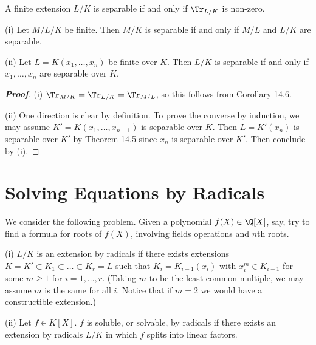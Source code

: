 \begin{corollary}
A finite extension $L/K$ is separable if and only if $\Tr_{L/K}$ is non-zero.
\end{corollary}

\begin{corollary}
\ben
\item [(i)] Let $M/L/K$ be finite. Then $M/K$ is separable if and only if $M/L$ and $L/K$ are separable.
\item [(ii)] Let $L = K(x_1, \dots , x_n)$ be finite over $K$. Then $L/K$ is separable if and only if $x_1, \dots , x_n$ are separable over $K$.
\een
\end{corollary}

\begin{proof}[\bf Proof]
\ben
\item [(i)] $\Tr_{M/K} = \Tr_{L/K} = \Tr_{M/L}$, so this follows from Corollary 14.6.
\item [(ii)] One direction is clear by definition. To prove the converse by induction, we may assume $K' = K(x_1, \dots , x_{n-1})$ is separable over $K$. Then $L = K'(x_n)$ is separable over $K'$ by Theorem 14.5 since $x_n$ is separable over $K'$. Then conclude by (i).
\een
\end{proof}


\section{Solving Equations by Radicals}

We consider the following problem. Given a polynomial $f(X) \in \Q[X]$, say, try to find a formula for roots of $f(X)$, involving fields operations and $n$th roots.

\begin{definition}
\ben
\item [(i)] $L/K$ is an extension by radicals if there exists extensions $K = K' \subset K_1 \subset \dots\subset K_r = L$ such that $K_i = K_{i-1}(x_i)$ with $x^m_i \in K_{i-1}$ for some $m \geq 1$ for $i = 1, \dots , r$. (Taking $m$ to be the least common multiple, we may assume $m$ is the same for all $i$. Notice that if $m = 2$ we would have a constructible extension.)

\item [(ii)] Let $f \in K[X]$. $f$ is soluble, or solvable, by radicals if there exists an extension by radicals $L/K$ in which $f$ splits into linear factors.
\een
\end{definition}

